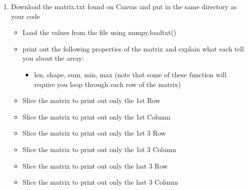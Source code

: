 \documentclass[11pt]{article}
\providecommand{\tightlist}{%
      \setlength{\itemsep}{0pt}\setlength{\parskip}{0pt}}
\begin{document}
    \begin{enumerate}
\def\labelenumi{\arabic{enumi}.}
\setcounter{enumi}{3}
\tightlist
\item
  Download the matrix.txt found on Canvas and put in the same directory
  as your code

  \begin{itemize}
  \tightlist
  \item
    Load the values from the file using numpy.loadtxt()
  \item
    print out the following properties of the matrix and explain what
    each tell you about the array:

    \begin{itemize}
    \tightlist
    \item
      len, shape, sum, min, max (note that some of these function will
      require you loop through each row of the matrix)
    \end{itemize}
  \item
    Slice the matrix to print out only the 1st Row
  \item
    Slice the matrix to print out only the 1st Column
  \item
    Slice the matrix to print out only the 1st 3 Row
  \item
    Slice the matrix to print out only the 1st 3 Column\\
  \item
    Slice the matrix to print out only the last 3 Row
  \item
    Slice the matrix to print out only the last 3 Column
  \end{itemize}
\end{enumerate}
\end{document}
